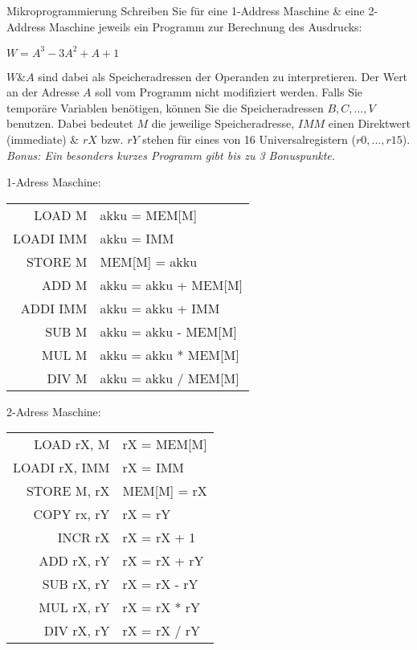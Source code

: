 \documentclass{exercisesheet}
\begin{document}
  \begin{exercise*}{Mikroprogrammierung}
    Schreiben Sie für eine 1-Address Maschine \& eine 2-Address Maschine jeweils ein Programm zur Berechnung des Ausdrucks:
      \begin{center}$W = A^3 - 3A^2 + A + 1$\end{center}
      $W$\&$A$ sind dabei als Speicheradressen der Operanden zu interpretieren. Der Wert an der Adresse $A$ soll vom Programm nicht modifiziert werden. Falls Sie temporäre Variablen benötigen, können Sie die Speicheradressen $B, C, ..., V$ benutzen. Dabei bedeutet $M$ die jeweilige Speicheradresse, $IMM$ einen Direktwert (immediate) \& $rX$ bzw. $rY$ stehen für eines von 16 Universalregistern ($r0, ..., r15$).\\
      \textit{Bonus: Ein besonders kurzes Programm gibt bis zu 3 Bonuspunkte.}
      \begin{multicols*}{2}
        1-Adress Maschine:\\
          \begin{tabular}{|r|l|}
            \hline
            LOAD M & akku = MEM[M]\\
            LOADI IMM & akku = IMM\\
            STORE M & MEM[M] = akku\\
            ADD M & akku = akku + MEM[M]\\
            ADDI IMM & akku = akku + IMM\\
            SUB M & akku = akku - MEM[M]\\
            MUL M & akku = akku * MEM[M]\\
            DIV M & akku = akku / MEM[M]\\
            \hline
          \end{tabular}

        2-Adress Maschine:\\
        \begin{tabular}{|r|l|}
          \hline
          LOAD rX, M & rX = MEM[M]\\
          LOADI rX, IMM & rX = IMM\\
          STORE M, rX & MEM[M] = rX\\
          COPY rx, rY & rX = rY\\
          INCR rX & rX = rX + 1\\
          ADD rX, rY & rX = rX + rY\\
          SUB rX, rY & rX = rX - rY\\
          MUL rX, rY & rX = rX * rY\\
          DIV rX, rY & rX = rX / rY\\
          \hline
        \end{tabular}
      \end{multicols*}
  \end{exercise*}
\end{document}
